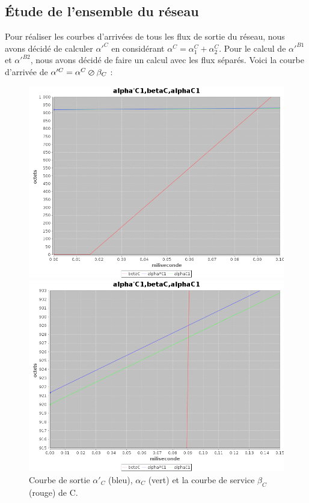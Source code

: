 \subsection{Étude de l'ensemble du réseau}
Pour réaliser les courbes d'arrivées de tous les flux de sortie du réseau, nous avons décidé de calculer $\alpha'^C$ en considérant $\alpha^C = \alpha_1^C + \alpha_2^C$. Pour le calcul de $\alpha'^{B1}$ et $\alpha'^{B2}$, nous avons décidé de faire un calcul avec les flux séparés.
Voici la courbe d'arrivée de $\alpha'^C = \alpha^C \varoslash \beta_C$ : 
\begin{figure}[!ht]%
\begin{minipage}{.48\textwidth}%
\centering%
\noindent\includegraphics[width = \textwidth]{./II/images/alphaP_C1.png}%
\caption{\label{fig:CS_C}Courbe de sortie $\alpha'_C$ (bleu), $\alpha_C$ (vert) et la courbe de service $\beta_C$ (rouge) de C.}%
\end{minipage}\hfill%
\begin{minipage}{.48\textwidth}%
\centering%
\noindent\includegraphics[width = \textwidth]{./II/images/alphaP_C1-2.png}%

\end{minipage}
\end{figure}
